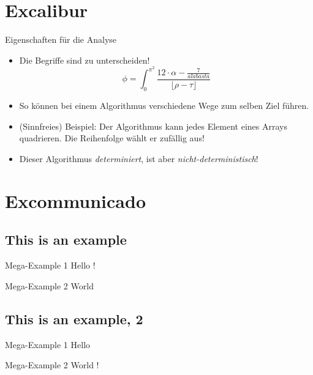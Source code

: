 \documentclass[aspectratio=169,usepdftitle=true]{beamer}
\begin{document}
\section{Excalibur}
\begin{frame}[fragile]{Eigenschaften für die Analyse}
    \begin{itemize}
        \item Die Begriffe sind zu unterscheiden!
\begin{equation*}
    \phi = \int_0^{\pi^2} \frac{12 \cdot \alpha - \frac{7}{alabasta}}{\lfloor \rho - \tau\rfloor}
\end{equation*}
        \item So können bei einem Algorithmus verschiedene Wege zum selben Ziel führen.
        \item (Sinnfreies) Beispiel: Der Algorithmus kann jedes Element eines Arrays quadrieren. Die Reihenfolge wählt er zufällig aus!
        \item Dieser Algorithmus \emph{determiniert}, ist aber \emph{nicht-deterministisch}!
    \end{itemize}
\end{frame}

\section{Excommunicado}
\subsection{This is an example}

\begin{frame}{Mega-Example 1}
    Hello \cite{knuth-fa}!
\end{frame}

\begin{frame}{Mega-Example 2}
    World
\end{frame}

\subsection{This is an example, 2}

\begin{frame}{Mega-Example 1}
    Hello
\end{frame}

\begin{frame}{Mega-Example 2}
    World \cite{knuth-web}!
\end{frame}
\end{document}
